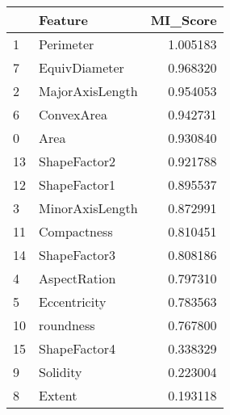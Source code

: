 \begin{tabular}{llr}
\toprule
 & Feature & MI_Score \\
\midrule
1 & Perimeter & 1.005183 \\
7 & EquivDiameter & 0.968320 \\
2 & MajorAxisLength & 0.954053 \\
6 & ConvexArea & 0.942731 \\
0 & Area & 0.930840 \\
13 & ShapeFactor2 & 0.921788 \\
12 & ShapeFactor1 & 0.895537 \\
3 & MinorAxisLength & 0.872991 \\
11 & Compactness & 0.810451 \\
14 & ShapeFactor3 & 0.808186 \\
4 & AspectRation & 0.797310 \\
5 & Eccentricity & 0.783563 \\
10 & roundness & 0.767800 \\
15 & ShapeFactor4 & 0.338329 \\
9 & Solidity & 0.223004 \\
8 & Extent & 0.193118 \\
\bottomrule
\end{tabular}
